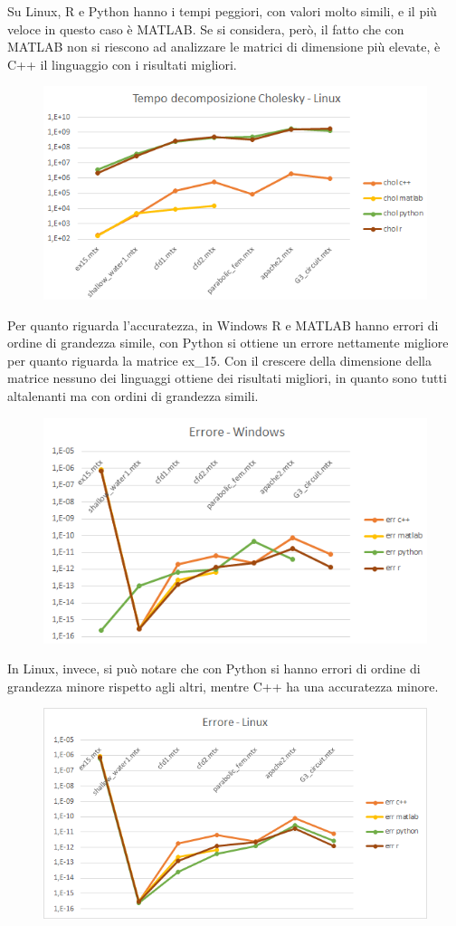 \documentclass[a4paper,10pt]{article}
\begin{document}
Su Linux, R e Python hanno i tempi peggiori, con valori molto simili, e il più veloce in questo caso è MATLAB. Se si considera, però, il fatto che con MATLAB non si riescono ad analizzare le matrici di dimensione più elevate, è C++ il linguaggio con i risultati migliori.
\begin{figure}[H]
\centering
  \includegraphics[width=0.6\linewidth]{img/tempochollinux.png}
\end{figure}


Per quanto riguarda l'accuratezza, in Windows R e MATLAB hanno errori di ordine di grandezza simile, con Python si ottiene un errore nettamente migliore per quanto riguarda la matrice ex\_15. Con il crescere della dimensione della matrice nessuno dei linguaggi ottiene dei risultati migliori, in quanto sono tutti altalenanti ma con ordini di grandezza simili.

\begin{figure}[H]
\centering
  \includegraphics[width=0.5\linewidth]{img/errwin.png}
\end{figure}

In Linux, invece, si può notare che con Python si hanno errori di ordine di grandezza minore rispetto agli altri, mentre C++ ha una accuratezza minore.
 
\begin{figure}[H]
\centering
  \includegraphics[width=0.5\linewidth]{img/errlinux.png}
\end{figure}
\end{document}

